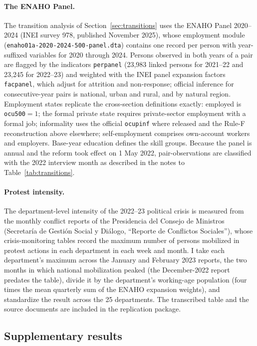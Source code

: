 \paragraph{The ENAHO Panel.} The transition analysis of Section~\ref{sec:transitions}
uses the ENAHO Panel 2020--2024 (INEI survey 978, published November 2025), whose
employment module (\texttt{enaho01a-2020-2024-500-panel.dta}) contains one record per
person with year-suffixed variables for 2020 through 2024. Persons observed in both
years of a pair are flagged by the indicators \texttt{perpanel} (23,983 linked persons
for 2021--22 and 23,245 for 2022--23) and weighted with the INEI panel expansion
factors \texttt{facpanel}, which adjust for attrition and non-response; official
inference for consecutive-year pairs is national, urban and rural, and by natural
region. Employment states replicate the cross-section definitions exactly: employed
is \texttt{ocu500}${}=1$; the formal private state requires private-sector employment
with a formal job; informality uses the official \texttt{ocupinf} where released and
the Rule-F reconstruction above elsewhere; self-employment comprises own-account
workers and employers. Base-year education defines the skill groups. Because the
panel is annual and the reform took effect on 1 May 2022, pair-observations are
classified with the 2022 interview month as described in the notes to
Table~\ref{tab:transitions}.

\paragraph{Protest intensity.} The department-level intensity of the 2022--23
political crisis is measured from the monthly conflict reports of the Presidencia del
Consejo de Ministros (Secretar\'ia de Gesti\'on Social y Di\'alogo, ``Reporte de
Conflictos Sociales''), whose crisis-monitoring tables record the maximum number of
persons mobilized in protest actions in each department in each week and month. I take
each department's maximum across the January and February 2023 reports, the two months
in which national mobilization peaked (the December-2022 report predates the table),
divide it by the department's working-age population (four times the mean quarterly sum
of the ENAHO expansion weights), and standardize the result across the 25 departments.
The transcribed table and the source documents are included in the replication
package.

\subsection{Supplementary results}

